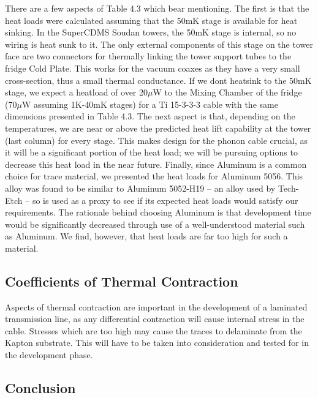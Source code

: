 \documentclass{report}
\begin{document}
\begin{table}[h]
\end{table}


There are a few aspects of Table 4.3 which bear mentioning. The first is that the heat loads were calculated assuming that the 50mK stage is available for heat sinking. In the SuperCDMS Soudan towers, the 50mK stage is internal, so no wiring is heat sunk to it. The only external components of this stage on the tower face are two connectors for thermally linking the tower support tubes to the fridge Cold Plate. This works for the vacuum coaxes as they have a very small cross-section, thus a small thermal conductance. If we dont heatsink to the 50mK stage, we expect a heatload of over 20$\mu$W to the Mixing Chamber of the fridge (70$\mu$W assuming 1K-40mK stages) for a Ti 15-3-3-3 cable with the same dimensions presented in Table 4.3. The next aspect is that, depending on the temperatures, we are near or above the predicted heat lift capability at the tower (last column) for every stage. This makes design for the phonon cable crucial, as it will be a significant portion of the heat load; we will be pursuing options to decrease this heat load in the near future. Finally, since Aluminum is a common choice for trace material, we presented the heat loads for Aluminum 5056. This alloy was found to be similar to Aluminum 5052-H19 -- an alloy used by Tech-Etch -- so is used as a proxy to see if its expected heat loads would satisfy our requirements. The rationale behind choosing Aluminum is that development time would be significantly decreased through use of a well-understood material such as Aluminum. We find, however, that heat loads are far too high for such a material.

\subsection{Coefficients of Thermal Contraction}
Aspects of thermal contraction are important in the development of a laminated transmission line, as any differential contraction will cause internal stress in the cable. Stresses which are too high may cause the traces to delaminate from the Kapton substrate. This will have to be taken into consideration and tested for in the development phase.

\subsection{Conclusion}
\end{document}
